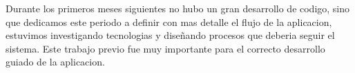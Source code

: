 
Durante los primeros meses siguientes no hubo un gran desarrollo de codigo, sino que dedicamos este periodo a definir con mas detalle el flujo
de la aplicacion, estuvimos investigando tecnologias y diseñando procesos que deberia seguir el sistema. Este trabajo previo fue muy importante
para el correcto desarrollo guiado de la aplicacion.


